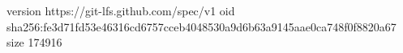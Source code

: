 version https://git-lfs.github.com/spec/v1
oid sha256:fe3d71fd53e46316cd6757cceb4048530a9d6b63a9145aae0ca748f0f8820a67
size 174916
